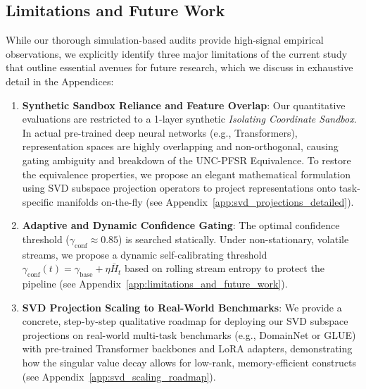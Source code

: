\subsection{Limitations and Future Work}
\label{sec:limitations}
While our thorough simulation-based audits provide high-signal empirical observations, we explicitly identify three major limitations of the current study that outline essential avenues for future research, which we discuss in exhaustive detail in the Appendices:
\begin{enumerate}
    \item \textbf{Synthetic Sandbox Reliance and Feature Overlap}: Our quantitative evaluations are restricted to a 1-layer synthetic \emph{Isolating Coordinate Sandbox}. In actual pre-trained deep neural networks (e.g., Transformers), representation spaces are highly overlapping and non-orthogonal, causing gating ambiguity and breakdown of the UNC-PFSR Equivalence. To restore the equivalence properties, we propose an elegant mathematical formulation using SVD subspace projection operators to project representations onto task-specific manifolds on-the-fly (see Appendix~\ref{app:svd_projections_detailed}).
    \item \textbf{Adaptive and Dynamic Confidence Gating}: The optimal confidence threshold ($\gamma_{\text{conf}} \approx 0.85$) is searched statically. Under non-stationary, volatile streams, we propose a dynamic self-calibrating threshold $\gamma_{\text{conf}}(t) = \gamma_{\text{base}} + \eta \bar{H}_t$ based on rolling stream entropy to protect the pipeline (see Appendix~\ref{app:limitations_and_future_work}).
    \item \textbf{SVD Projection Scaling to Real-World Benchmarks}: We provide a concrete, step-by-step qualitative roadmap for deploying our SVD subspace projections on real-world multi-task benchmarks (e.g., DomainNet or GLUE) with pre-trained Transformer backbones and LoRA adapters, demonstrating how the singular value decay allows for low-rank, memory-efficient constructs (see Appendix~\ref{app:svd_scaling_roadmap}).
\end{enumerate}